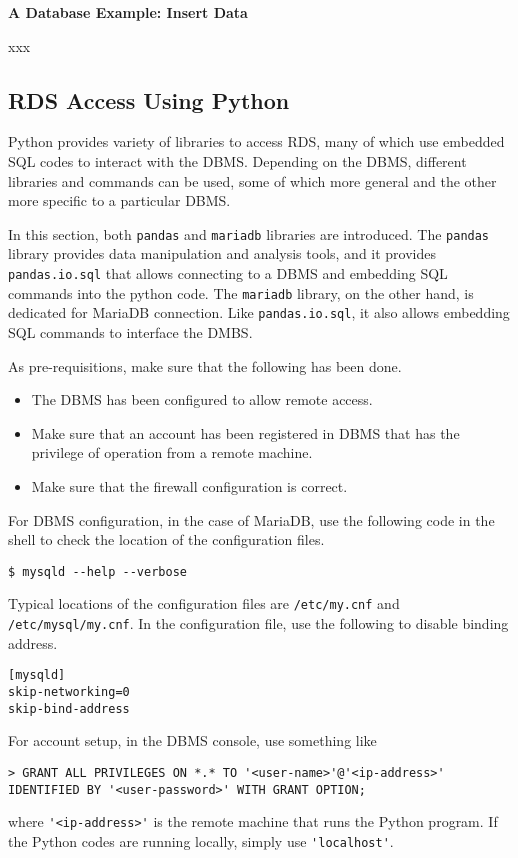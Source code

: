 \vspace{0.1in}
\noindent \textbf{A Database Example: Insert Data}
\vspace{0.1in}

xxx


\subsection{RDS Access Using Python}

Python provides variety of libraries to access RDS, many of which use embedded SQL codes to interact with the DBMS. Depending on the DBMS, different libraries and commands can be used, some of which more general and the other more specific to a particular DBMS.

In this section, both \verb|pandas| and \verb|mariadb| libraries are introduced. The \verb|pandas| library provides data manipulation and analysis tools, and it provides \verb|pandas.io.sql| that allows connecting to a DBMS and embedding SQL commands into the python code. The \verb|mariadb| library, on the other hand, is dedicated for MariaDB connection. Like \verb|pandas.io.sql|, it also allows embedding SQL commands to interface the DMBS.

As pre-requisitions, make sure that the following has been done.
\begin{itemize}
  \item The DBMS has been configured to allow remote access.
  \item Make sure that an account has been registered in DBMS that has the privilege of operation from a remote machine.
  \item Make sure that the firewall configuration is correct.
\end{itemize}

For DBMS configuration, in the case of MariaDB, use the following code in the shell to check the location of the configuration files.
\begin{lstlisting}
$ mysqld --help --verbose
\end{lstlisting}
Typical locations of the configuration files are \verb|/etc/my.cnf| and \verb|/etc/mysql/my.cnf|. In the configuration file, use the following to disable binding address.
\begin{lstlisting}
[mysqld]
skip-networking=0
skip-bind-address
\end{lstlisting}

For account setup, in the DBMS console, use something like
\begin{lstlisting}
> GRANT ALL PRIVILEGES ON *.* TO '<user-name>'@'<ip-address>' IDENTIFIED BY '<user-password>' WITH GRANT OPTION;
\end{lstlisting}
where \verb|'<ip-address>'| is the remote machine that runs the Python program. If the Python codes are running locally, simply use \verb|'localhost'|.

